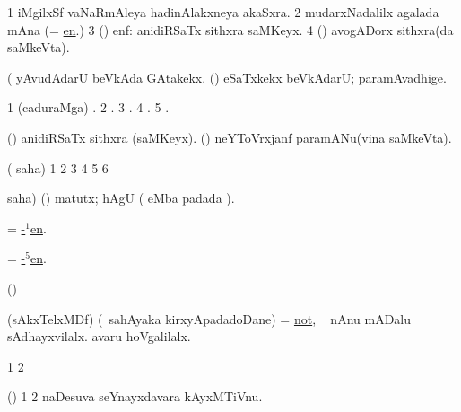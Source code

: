 \bentry
{}
\gl{\nA}
\bmng
\bnum
\num{1} iMgilxSf vaNaRmAleya hadinAlakxneya akaSxra. 
\num{2} mudarxNadalilx agalada mAna (= \hyperref{kandict_e.pdf}{E}{en}{en}.) 
\num{3} (\biVga) enf:  anidiRSaTx sithxra saMKeyx. 
\num{4} (\Bwvi) avogADorx sithxra(da saMkeVta). 
\enum
\emng

\noindent
\gl{\pagu}
\expl{}
\bmng
{} (  
\banum
{} yAvudAdarU beVkAda GAtakekx. 
 (\rUpa) eSaTxkekx beVkAdarU; paramAvadhige. 
\eanum
\emng
\eentry

\bentry
{}
\pron{}
\gl{\saMkiSx}
\bmng
\bnum
\num{1} (caduraMga) . 
\num{2} . 
\num{3} . 
\num{4} . 
\num{5} . 
\enum
\emng
\eentry

\bentry
{}
\pron{}
\gl{\saMkeV}
\bmng
\banum
{} (\biVga) anidiRSaTx sithxra (saMKeyx). 
 (\ravi) neYToVrxjanf paramANu(vina saMkeVta). 
\eanum
\emng
\eentry

\bentry
{}
\gl{\saMkiSx}
\bmng
 ( saha) 
\bnum
\num{1}  
\num{2}  
\num{3}  
\num{4}  
\num{5}  
\num{6}  
\enum
\emng
\eentry

\bentry
{}
\pron{}
\gl{\saMavayx}
\bmng
  saha) (\AmA) matutx; hAgU ( eMba padada \saMkiSx). 
\emng
\eentry

\bentry
{}
\pron{}
\gl{\uparx}
\bmng
= \hyperref{kandict_e.pdf}{E}{hyp-en(1)}{-$^1$en}.
\emng
\eentry

\bentry
{}
\pron{}
\gl{\uparx}
\bmng
= \hyperref{kandict_e.pdf}{E}{hyp-en(5)}{-$^5$en}. 
\emng
\eentry

\bentry
{}
\gl{\saMkeV}
\bmng
(\ravi)  
\emng
\eentry

\bentry
{}
\gl{\kirxvi}
\bmng
 (sAkxTelxMDf) (\sA\ sahAyaka kirxyApadadoDane) = \hyperlink{not}{not}, \udA\  nAnu mADalu sAdhayxvilalx.  avaru hoVgalilalx. 
\emng
\eentry

\bentry
{}
\gl{\saMkiSx}
\bmng
\bnum
\num{1}  
\num{2}  
\enum
\emng
\eentry

\bentry
{}
\gl{\saMkiSx}
\bmng
(\birx) 
\bnum
\num{1}  
\num{2}  naDesuva seYnayxdavara kAyxMTiVnu. 
\enum
\emng
\eentry

